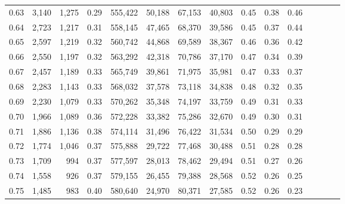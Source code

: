\begin{tabular}{rrrcrrrrrrrrrrr}
0.63 &   3,140 &   1,275 &                                       0.29 &  555,422 &   50,188 &   67,153 &   40,803 &  0.45 &  0.38 &                         0.46 \\
0.64 &   2,723 &   1,217 &                                       0.31 &  558,145 &   47,465 &   68,370 &   39,586 &  0.45 &  0.37 &                         0.44 \\
0.65 &   2,597 &   1,219 &                                       0.32 &  560,742 &   44,868 &   69,589 &   38,367 &  0.46 &  0.36 &                         0.42 \\
0.66 &   2,550 &   1,197 &                                       0.32 &  563,292 &   42,318 &   70,786 &   37,170 &  0.47 &  0.34 &                         0.39 \\
0.67 &   2,457 &   1,189 &                                       0.33 &  565,749 &   39,861 &   71,975 &   35,981 &  0.47 &  0.33 &                         0.37 \\
0.68 &   2,283 &   1,143 &                                       0.33 &  568,032 &   37,578 &   73,118 &   34,838 &  0.48 &  0.32 &                         0.35 \\
0.69 &   2,230 &   1,079 &                                       0.33 &  570,262 &   35,348 &   74,197 &   33,759 &  0.49 &  0.31 &                         0.33 \\
0.70 &   1,966 &   1,089 &                                       0.36 &  572,228 &   33,382 &   75,286 &   32,670 &  0.49 &  0.30 &                         0.31 \\
0.71 &   1,886 &   1,136 &                                       0.38 &  574,114 &   31,496 &   76,422 &   31,534 &  0.50 &  0.29 &                         0.29 \\
0.72 &   1,774 &   1,046 &                                       0.37 &  575,888 &   29,722 &   77,468 &   30,488 &  0.51 &  0.28 &                         0.28 \\
0.73 &   1,709 &     994 &                                       0.37 &  577,597 &   28,013 &   78,462 &   29,494 &  0.51 &  0.27 &                         0.26 \\
0.74 &   1,558 &     926 &                                       0.37 &  579,155 &   26,455 &   79,388 &   28,568 &  0.52 &  0.26 &                         0.25 \\
0.75 &   1,485 &     983 &                                       0.40 &  580,640 &   24,970 &   80,371 &   27,585 &  0.52 &  0.26 &                         0.23 \\

\end{tabular}
